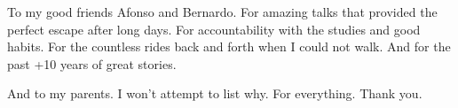 \begin{acknowledgments}
To my good friends Afonso and Bernardo. For amazing talks that provided the perfect escape after long days. For accountability with the studies and good habits. For the countless rides back and forth when I could not walk. And for the past +10 years of great stories. 


\vspace{1cm}

And to my parents. I won't attempt to list why. For everything. Thank you.


\end{acknowledgments}
\clearpage
\thispagestyle{empty}
\cleardoublepage